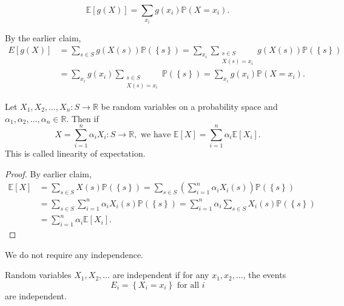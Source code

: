 \begin{claim}
    \[
        \mathbb{E} [g(X)] = \sum_{x_i} g(x_i) \mathbb{P} (X = x_i). 
    \]
\end{claim}

\begin{explanation}
    By the earlier claim, 
    \begin{align*}
        E [g(X)] &= \sum_{s \in S} g(X(s)) \mathbb{P} \left( \left\{ s \right\}  \right) = \sum_{x_i} \sum_{\substack{s \in S \\ X(s) = x_i}} g(X(s)) \mathbb{P} \left( \left\{ s \right\}  \right) \\
        &= \sum_{x_i} g(x_i) \sum_{\substack{s \in S \\ X(s) = x_i}} \mathbb{P} \left( \left\{ s \right\}  \right) = \sum_{x_i} g(x_i) \mathbb{P} (X = x_i).       
    \end{align*}
\end{explanation}

\begin{proposition}
    Let \(X_1, X_2, \dots , X_n: S \to \mathbb{R} \) be random variables on a probability space and \(\alpha _1, \alpha _2, \dots , \alpha _n \in \mathbb{R} \). Then if 
    \[
        X = \sum_{i=1}^n \alpha _i X_i : S \to \mathbb{R} , \text{ we have } \mathbb{E} [X] = \sum_{i=1}^n \alpha _i \mathbb{E} [X_i].   
    \] 
    This is called linearity of expectation. 
\end{proposition}

\begin{proof}
    By earlier claim,
    \begin{align*}
        \mathbb{E} [X] &= \sum_{s \in S} X(s) \mathbb{P} \left( \left\{ s \right\}  \right) = \sum_{s \in S} \left( \sum_{i=1}^n \alpha _i X_i(s)  \right) \mathbb{P} \left( \left\{ s \right\}  \right) \\
        &= \sum_{s \in S} \sum_{i=1}^n \alpha _i X_i(s) \mathbb{P} \left( \left\{ s \right\}  \right) = \sum_{i=1}^n \alpha _i \sum_{s \in S} X_i(s) \mathbb{P} \left( \left\{ s \right\}  \right) \\
        &= \sum_{i=1}^n \alpha _i \mathbb{E} [X_i].            
    \end{align*}
\end{proof}

\begin{remark}
    We do not require any independence.
\end{remark}

\begin{definition}
    Random variables \(X_1, X_2, \dots \) are independent if for any \(x_1, x_2, \dots \), the events 
    \[
        E_i = \left\{ X_i = x_i \right\} \text{ for all } i 
    \] 
    are independent.
\end{definition}

